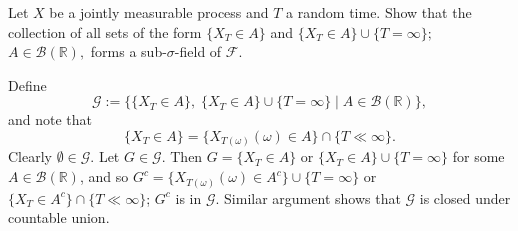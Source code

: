 \documentclass{report}
\begin{document}
\begin{prob}
	Let \( X \) be a jointly measurable process and \( T \) a random time. Show that the
	collection of all sets of the form \( \{X_T\in A\} \) and \( \{X_T\in A\} \cup \{ T=\infty \}; \)
	\( A\in \mathscr{B}(\mathbb{R}), \) forms a sub-\( \sigma \)-field of \( \mathscr{F} \).
\end{prob}
\begin{prf}
	Define
	\[\mathscr{G}:=\{ \{X_T\in A\},\; \{X_T\in A\}\cup\{T=\infty\} \mid A\in \mathscr{B}(\mathbb{R})\},\]
	and note that
	\[
		\{X_T\in A\}=\{X_{T(\omega)}(\omega)\in A\}\cap \{T \ll \infty\}.
	\]
	Clearly \( \emptyset \in \mathscr{G} \).
	Let \( G \in \mathscr{G} \). Then \( G=\{X_T\in A\} \) or \( \{X_T\in A\} \cup \{ T=\infty \} \)
	for some \( A\in \mathscr{B}(\mathbb{R}) \),
	and so \( G^c=\{X_{T(\omega)}(\omega)\in A^c\}\cup \{ T=\infty \} \) or \( \{ X_T\in A^c \} \cap \{ T \ll \infty \} \); \( G^c \) is in \( \mathscr{G} \).
	Similar argument shows that \( \mathscr{G} \) is closed under countable union.
\end{prf}
\end{document}
